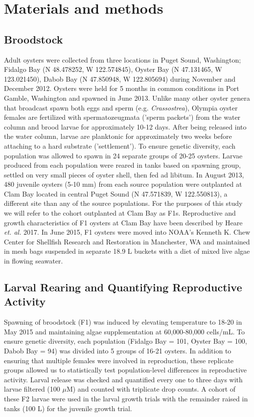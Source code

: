 \documentclass[10pt,letterpaper]{article}
\begin{document}
\section*{Materials and methods}
\subsection*{Broodstock}

Adult oysters were collected from three locations in Puget Sound, Washington; Fidalgo Bay (N 48.478252, W 122.574845), Oyster Bay (N 47.131465, W 123.021450), Dabob Bay (N 47.850948, W 122.805694) during November and December 2012. Oysters were held for 5 months in common conditions in Port Gamble, Washington and spawned in June 2013. Unlike many other oyster genera that broadcast spawn both eggs and sperm (e.g. \textit{Crassostrea}), Olympia oyster females are fertilized with spermatozeugmata ('sperm packets') from the water column and brood larvae for approximately 10-12 days. After being released into the water column, larvae are planktonic for approximately two weeks before attaching to a hard substrate ('settlement'). To ensure genetic diversity, each population was allowed to spawn in 24 separate groups of 20-25 oysters. Larvae produced from each population were reared in tanks based on spawning group, settled on very small pieces of oyster shell, then fed ad libitum. In August 2013, 480 juvenile oysters (5-10 mm) from each source population were outplanted at Clam Bay located in central Puget Sound (N 47.571839, W 122.550813), a different site than any of the source populations. For the purposes of this study we will refer to the cohort outplanted at Clam Bay as F1s. Reproductive and growth characteristics of F1 oysters at Clam Bay have been described by Heare \textit{et. al.} 2017. In June 2015, F1 oysters were moved into NOAA's Kenneth K. Chew Center for Shellfish Research and Restoration in Manchester, WA and maintained in mesh bags suspended in separate 18.9 L buckets with a diet of mixed live algae in flowing seawater.

\subsection*{Larval Rearing and Quantifying Reproductive Activity}
Spawning of broodstock (F1) was induced by elevating temperature to 18-20  in May 2015 and maintaining algae supplementation at 60,000-80,000 cells/mL. To ensure genetic diversity, each population (Fidalgo Bay = 101, Oyster Bay = 100, Dabob Bay = 94) was divided into 5 groups of 16-21 oysters. In addition to ensuring that multiple females were involved in reproduction, these replicate groups allowed us to statistically test population-level differences in reproductive activity. Larval release was checked and quantified every one to three days with larvae filtered (100 $\mu$M) and counted with triplicate drop counts. A cohort of these F2 larvae were used in the larval growth trials with the remainder raised in tanks (100 L) for the juvenile growth trial.
\end{document}
